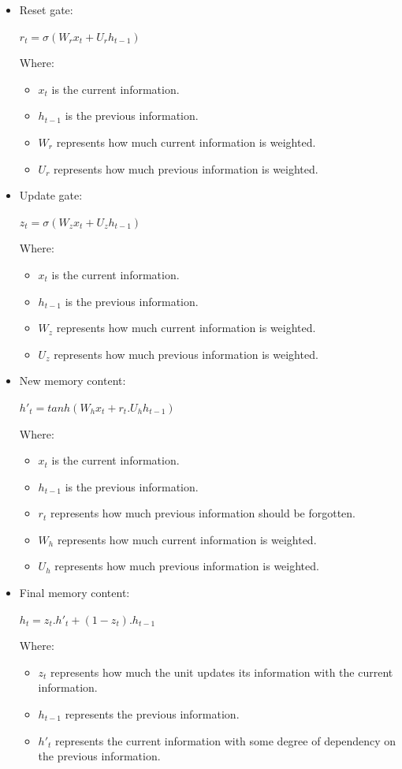\documentclass{ieeeojies}
\begin{document}
\begin{itemize}
	\item Reset gate:
	\newline \centerline{$r_{t} = \sigma(W_{r}x_{t} + U_{r}h_{t-1})$}
	\newline Where:
	\begin{itemize}
		\item $x_{t}$ is the current information.
		\item $h_{t-1}$ is the previous information.
		\item $W_{r}$ represents how much current information is weighted.
		\item $U_{r}$ represents how much previous information is weighted.
	\end{itemize}
	\item Update gate:
	\newline \centerline{$z_{t} = \sigma(W_{z}x_{t} + U_{z}h_{t-1})$}
	\newline Where:
	\begin{itemize}
		\item $x_{t}$ is the current information.
		\item $h_{t-1}$ is the previous information.
		\item $W_{z}$ represents how much current information is weighted.
		\item $U_{z}$ represents how much previous information is weighted.
	\end{itemize}
	\item New memory content:
	\newline \centerline{$h'_{t} =  tanh(W_{h}x_{t} + r_{t}.U_{h}h_{t-1})$}
	\newline Where:
	\begin{itemize}
		\item $x_{t}$ is the current information.
		\item $h_{t-1}$ is the previous information.
		\item $r_{t}$ represents how much previous information should be forgotten.
		\item $W_{h}$ represents how much current information is weighted.
		\item $U_{h}$ represents how much previous information is weighted.
	\end{itemize}
	\item Final memory content:
	\newline \centerline{$h_{t} =  z_{t}.h'_{t} + (1 - z_{t}).h_{t-1}$}
	\newline Where:
	\begin{itemize}
		\item $z_{t}$ represents how much the unit updates its information with the current information.
		\item $h_{t-1}$ represents the previous information.
		\item $h'_{t}$ represents the current information with some degree of dependency on the previous information.
	\end{itemize}
\end{itemize}
\end{document}
